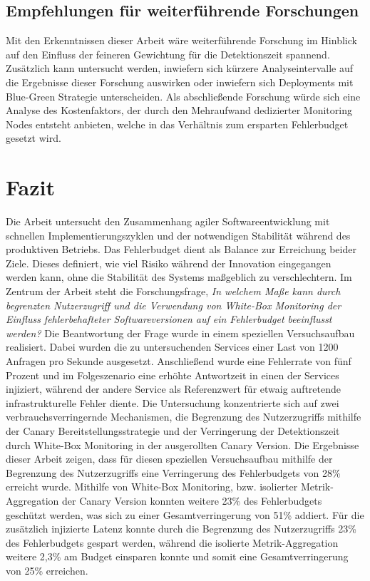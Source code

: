 \documentclass[
12pt,
a4paper,
twoside,
openright
]{report}
\begin{document}
	\section{Empfehlungen für weiterführende Forschungen}
	Mit den Erkenntnissen dieser Arbeit wäre weiterführende Forschung im Hinblick auf den Einfluss der feineren Gewichtung für die Detektionszeit spannend. Zusätzlich kann untersucht werden, inwiefern sich kürzere Analyseintervalle auf die Ergebnisse dieser Forschung auswirken oder inwiefern sich Deployments mit Blue-Green Strategie unterscheiden. Als abschließende Forschung würde sich eine Analyse des Kostenfaktors, der durch den Mehraufwand dedizierter Monitoring Nodes entsteht anbieten, welche in das Verhältnis zum ersparten Fehlerbudget gesetzt wird.
	
	\chapter{Fazit}
	
	Die Arbeit untersucht den Zusammenhang agiler Softwareentwicklung mit schnellen Implementierungszyklen und der notwendigen Stabilität während des produktiven Betriebs. Das Fehlerbudget dient als Balance zur Erreichung beider Ziele. Dieses definiert, wie viel Risiko während der Innovation eingegangen werden kann, ohne die Stabilität des Systems maßgeblich zu verschlechtern. Im Zentrum der Arbeit steht die Forschungsfrage, \textit{In welchem Maße kann durch begrenzten Nutzerzugriff und die Verwendung von White-Box Monitoring der Einfluss fehlerbehafteter Softwareversionen auf ein Fehlerbudget beeinflusst werden?} 
	Die Beantwortung der Frage wurde in einem speziellen Versuchsaufbau realisiert. Dabei wurden die zu untersuchenden Services einer Last von 1200 Anfragen pro Sekunde ausgesetzt. Anschließend wurde eine Fehlerrate von fünf Prozent und im Folgeszenario eine erhöhte Antwortzeit in einen der Services injiziert, während der andere Service als Referenzwert für etwaig auftretende infrastrukturelle Fehler diente. Die Untersuchung konzentrierte sich auf zwei verbrauchsverringernde Mechanismen, die Begrenzung des Nutzerzugriffs mithilfe der Canary Bereitstellungsstrategie und der Verringerung der Detektionszeit durch White-Box Monitoring in der ausgerollten Canary Version. Die Ergebnisse dieser Arbeit zeigen, dass für diesen speziellen Versuchsaufbau mithilfe der Begrenzung des Nutzerzugriffs eine Verringerung des Fehlerbudgets von 28\% erreicht wurde. Mithilfe von White-Box Monitoring, bzw. isolierter Metrik-Aggregation der Canary Version konnten weitere 23\% des Fehlerbudgets geschützt werden, was sich zu einer Gesamtverringerung von 51\% addiert. Für die zusätzlich injizierte Latenz konnte durch die Begrenzung des Nutzerzugriffs 23\% des Fehlerbudgets gespart werden, während die isolierte Metrik-Aggregation weitere 2,3\% am Budget einsparen konnte und somit eine Gesamtverringerung von 25\% erreichen. 
	
\end{document}
